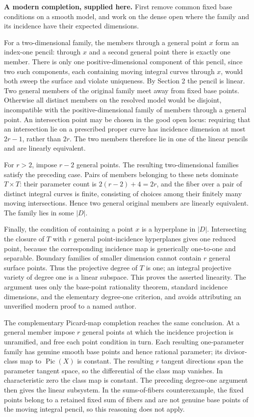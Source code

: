 \textbf{A modern completion, supplied here.} First remove common fixed base conditions on a smooth model, and work on the dense open where the family and its incidence have their expected dimensions.

For a two-dimensional family, the members through a general point \(x\) form an index-one pencil: through \(x\) and a second general point there is exactly one member. There is only one positive-dimensional component of this pencil, since two such components, each containing moving integral curves through \(x\), would both sweep the surface and violate uniqueness. By Section 2 the pencil is linear. Two general members of the original family meet away from fixed base points. Otherwise all distinct members on the resolved model would be disjoint, incompatible with the positive-dimensional family of members through a general point. An intersection point may be chosen in the good open locus: requiring that an intersection lie on a prescribed proper curve has incidence dimension at most \(2r-1\), rather than \(2r\). The two members therefore lie in one of the linear pencils and are linearly equivalent.

For \(r>2\), impose \(r-2\) general points. The resulting two-dimensional families satisfy the preceding case. Pairs of members belonging to these nets dominate \(T\times T\): their parameter count is \(2(r-2)+4=2r\), and the fiber over a pair of distinct integral curves is finite, consisting of choices among their finitely many moving intersections. Hence two general original members are linearly equivalent. The family lies in some \(|D|\).

Finally, the condition of containing a point \(x\) is a hyperplane in \(|D|\). Intersecting the closure of \(T\) with \(r\) general point-incidence hyperplanes gives one reduced point, because the corresponding incidence map is generically one-to-one and separable. Boundary families of smaller dimension cannot contain \(r\) general surface points. Thus the projective degree of \(T\) is one; an integral projective variety of degree one is a linear subspace. This proves the asserted linearity. The argument uses only the base-point rationality theorem, standard incidence dimensions, and the elementary degree-one criterion, and avoids attributing an unverified modern proof to a named author.

The complementary Picard-map completion reaches the same conclusion. At a general member impose \(r\) general points at which the incidence projection is unramified, and free each point condition in turn. Each resulting one-parameter family has genuine smooth base points and hence rational parameter; its divisor-class map to \(\operatorname{Pic}(X)\) is constant. The resulting \(r\) tangent directions span the parameter tangent space, so the differential of the class map vanishes. In characteristic zero the class map is constant. The preceding degree-one argument then gives the linear subsystem. In the sums-of-fibers counterexample, the fixed points belong to a retained fixed sum of fibers and are not genuine base points of the moving integral pencil, so this reasoning does not apply.

